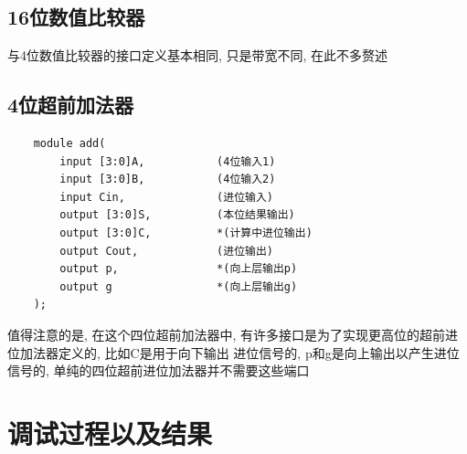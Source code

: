 \documentclass[fontset=windows,12pt]{article}
\begin{document}
    \subsection{16位数值比较器}
        与4位数值比较器的接口定义基本相同, 只是带宽不同, 在此不多赘述

    \subsection{4位超前加法器}
    {\setmainfont{Courier New Bold} 
    \begin{lstlisting}
    module add(
        input [3:0]A,           (4位输入1)
        input [3:0]B,           (4位输入2)
        input Cin,              (进位输入)
        output [3:0]S,          (本位结果输出)
        output [3:0]C,          *(计算中进位输出)
        output Cout,            (进位输出)
        output p,               *(向上层输出p)
        output g                *(向上层输出g)
    );
    \end{lstlisting}}
    值得注意的是, 在这个四位超前加法器中, 有许多接口是为了实现更高位的超前进位加法器定义的, 比如C是用于向下输出
    进位信号的, p和g是向上输出以产生进位信号的, 单纯的四位超前进位加法器并不需要这些端口


\section{调试过程以及结果}
\end{document}
